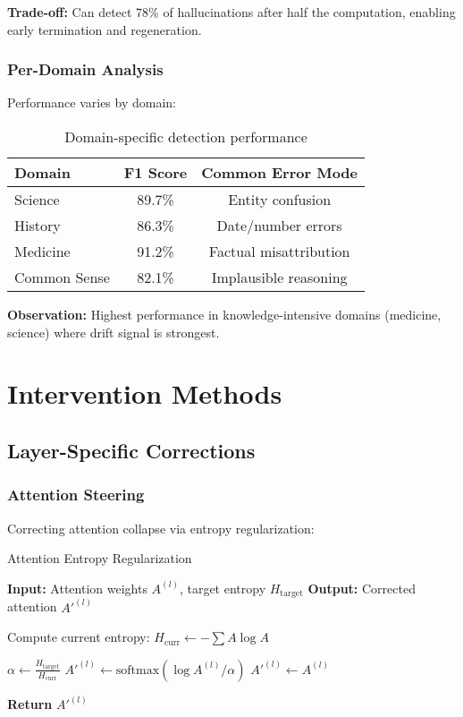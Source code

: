 \documentclass[11pt]{article}
\begin{document}
\textbf{Trade-off:} Can detect 78\% of hallucinations after half the computation, enabling early termination and regeneration.

\subsubsection{Per-Domain Analysis}

Performance varies by domain:

\begin{table}[H]
\centering
\begin{tabular}{@{}lcc@{}}
\toprule
\textbf{Domain} & \textbf{F1 Score} & \textbf{Common Error Mode} \\ \midrule
Science & 89.7\% & Entity confusion \\
History & 86.3\% & Date/number errors \\
Medicine & 91.2\% & Factual misattribution \\
Common Sense & 82.1\% & Implausible reasoning \\ \bottomrule
\end{tabular}
\caption{Domain-specific detection performance}
\end{table}

\textbf{Observation:} Highest performance in knowledge-intensive domains (medicine, science) where drift signal is strongest.

\section{Intervention Methods}

\subsection{Layer-Specific Corrections}

\subsubsection{Attention Steering}

Correcting attention collapse via entropy regularization:

\begin{algorithm}
\caption{Attention Entropy Regularization}
\begin{algorithmic}[1]
\State \textbf{Input:} Attention weights $A^{(l)}$, target entropy $H_{\text{target}}$
\State \textbf{Output:} Corrected attention $A'^{(l)}$

\State Compute current entropy: $H_{\text{curr}} \leftarrow -\sum A \log A$

    \State $\alpha \leftarrow \frac{H_{\text{target}}}{H_{\text{curr}}}$
    \State $A'^{(l)} \leftarrow \text{softmax}(\log A^{(l)} / \alpha)$
\Else
    \State $A'^{(l)} \leftarrow A^{(l)}$ 
\EndIf

\State \textbf{Return} $A'^{(l)}$
\end{algorithmic}
\end{algorithm}
\end{document}
